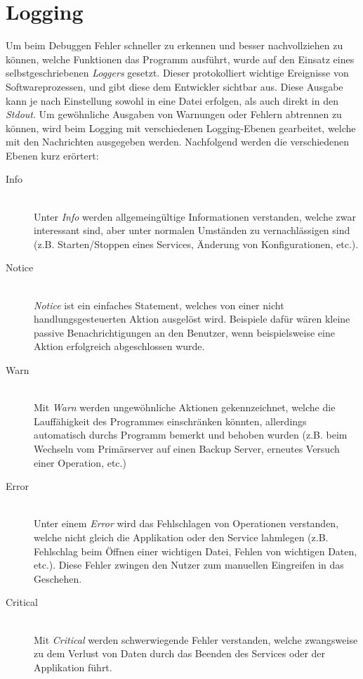 \section{Logging}
Um beim Debuggen Fehler schneller zu erkennen und besser nachvollziehen zu
können, welche Funktionen das Programm ausführt, wurde auf den Einsatz eines
selbstgeschriebenen \textit{Loggers} gesetzt. Dieser protokolliert wichtige
Ereignisse von Softwareprozessen, und gibt diese dem Entwickler sichtbar aus.
Diese Ausgabe kann je nach Einstellung sowohl in eine Datei erfolgen, als auch
direkt in den \textit{Stdout}. Um gewöhnliche Ausgaben von Warnungen oder
Fehlern abtrennen zu können, wird beim Logging mit verschiedenen Logging-Ebenen
gearbeitet, welche mit den Nachrichten ausgegeben werden. Nachfolgend werden
die verschiedenen Ebenen kurz erörtert:

\begin{description}
\item[Info] \hfil \\
Unter \textit{Info} werden allgemeingültige Informationen verstanden, welche zwar
interessant sind, aber unter normalen Umständen zu vernachlässigen sind (z.B.
Starten/Stoppen eines Services, Änderung von Konfigurationen, etc.).
\item[Notice] \hfil \\ 
\textit{Notice} ist ein einfaches Statement, welches von einer nicht
handlungsgesteuerten Aktion ausgelöst wird. Beispiele dafür wären kleine
passive Benachrichtigungen an den Benutzer, wenn beispielsweise eine Aktion
erfolgreich abgeschlossen wurde.
\item[Warn] \hfil \\ 
Mit \textit{Warn} werden ungewöhnliche Aktionen gekennzeichnet, welche die
Lauffähigkeit des Programmes einschränken könnten, allerdings
automatisch durchs Programm bemerkt und behoben wurden (z.B. beim Wechseln vom
Primärserver auf einen Backup Server, erneutes Versuch einer Operation, etc.)
\item[Error] \hfil \\ 
Unter einem \textit{Error} wird das Fehlschlagen von Operationen verstanden,
welche nicht gleich die Applikation oder den Service lahmlegen (z.B. Fehlschlag
beim Öffnen einer wichtigen Datei, Fehlen von wichtigen Daten, etc.). Diese
Fehler zwingen den Nutzer zum manuellen Eingreifen in das Geschehen.
\item[Critical] \hfil \\ 
Mit \textit{Critical} werden schwerwiegende Fehler verstanden, welche
zwangsweise zu dem Verlust von Daten durch das Beenden des Services
oder der Applikation führt.
\end{description}


